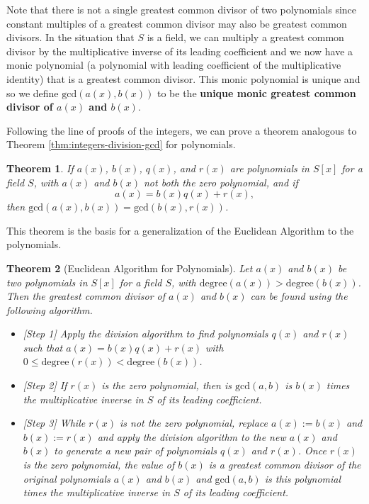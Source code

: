 \documentclass[
]{book}
\providecommand{\tightlist}{%
  \setlength{\itemsep}{0pt}\setlength{\parskip}{0pt}}
\newtheorem{theorem}{Theorem}[chapter]
\theoremstyle{definition}
\theoremstyle{definition}
\theoremstyle{definition}
\theoremstyle{remark}
\begin{document}
Note that there is not a single greatest common divisor of two polynomials since constant multiples of a greatest common divisor may also be greatest common divisors. In the situation that \(S\) is a field, we can multiply a greatest common divisor by the multiplicative inverse of its leading coefficient and we now have a monic polynomial (a polynomial with leading coefficient of the multiplicative identity) that is a greatest common divisor. This monic polynomial is unique and so we define \(\mathrm{gcd}(a(x),b(x))\) to be the \textbf{unique monic greatest common divisor of \(a(x)\) and \(b(x)\)}.

Following the line of proofs of the integers, we can prove a theorem analogous to Theorem \ref{thm:integers-division-gcd} for polynomials.

\begin{theorem}
\protect\hypertarget{thm:polynomial-division-gcd}{}{\label{thm:polynomial-division-gcd} }If \(a(x)\), \(b(x)\), \(q(x)\), and \(r(x)\) are polynomials in \(S[x]\) for a field \(S\), with \(a(x)\) and \(b(x)\) not both the zero polynomial, and if \[a(x)=b(x)q(x)+r(x),\] then \(\mathrm{gcd}(a(x),b(x))=\mathrm{gcd}(b(x),r(x))\).
\end{theorem}

This theorem is the basis for a generalization of the Euclidean Algorithm to the polynomials.

\begin{theorem}[Euclidean Algorithm for Polynomials]
\protect\hypertarget{thm:unnamed-chunk-201}{}{\label{thm:unnamed-chunk-201} {} }Let \(a(x)\) and \(b(x)\) be two polynomials in \(S[x]\) for a field \(S\), with \(\mathrm{degree}(a(x))>\mathrm{degree}(b(x))\). Then the greatest common divisor of \(a(x)\) and \(b(x)\) can be found using the following algorithm.

\begin{itemize}
\tightlist
\item
  {[}Step 1{]} Apply the division algorithm to find polynomials \(q(x)\) and \(r(x)\) such that \(a(x)=b(x)q(x)+r(x)\) with \(0\leq \mathrm{degree}(r(x))<\mathrm{degree}(b(x))\).
\item
  {[}Step 2{]} If \(r(x)\) is the zero polynomial, then is \(\mathrm{gcd}(a,b)\) is \(b(x)\) times the multiplicative inverse in \(S\) of its leading coefficient.
\item
  {[}Step 3{]} While \(r(x)\) is not the zero polynomial, replace \(a(x):=b(x)\) and \(b(x):=r(x)\) and apply the division algorithm to the new \(a(x)\) and \(b(x)\) to generate a new pair of polynomials \(q(x)\) and \(r(x)\). Once \(r(x)\) is the zero polynomial, the value of \(b(x)\) is a greatest common divisor of the original polynomials \(a(x)\) and \(b(x)\) and \(\mathrm{gcd}(a,b)\) is this polynomial times the multiplicative inverse in \(S\) of its leading coefficient.
\end{itemize}
\end{theorem}
\end{document}
